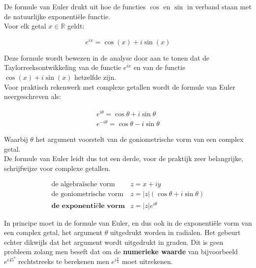 De formule van Euler drukt uit hoe de functies $\cos$ en $\sin$ in verband staan met de natuurlijke exponenti\"{e}le functie.\\
Voor elk getal $x \in \mathbb{R}$ geldt:\\

\begin{framed}
	\[ e^{ix}=\cos(x) + i \sin(x) \]
\end{framed}

Deze formule wordt bewezen in de analyse door aan te tonen dat de Taylorreeksontwikkeling van de functie $e^{ix}$ en van de functie $\cos(x) + i \sin(x)$ hetzelfde zijn. \\

Voor praktisch rekenwerk met complexe getallen wordt de formule van Euler neergeschreven als:\\

\begin{framed}
	\[  \begin{array}{l} 
	e^{i \theta}=\cos \theta +i \sin \theta \\
	e^{-i \theta}=\cos \theta - i \sin \theta 
	\end{array}  \]
\end{framed}

Waarbij $\theta$ het argument voorstelt van de goniometrische vorm van een complex getal. \\
De formule van Euler leidt dus tot een derde, voor de praktijk zeer belangrijke, schrijfwijze voor complexe getallen.\\

\begin{framed}
	\[ \begin{array}{ll}
	\text{de algebra\"{i}sche vorm} & z=x+iy \\
	\text{de goniometrische vorm} & z=|z|(\cos \theta +i \sin \theta) \\
	\textbf{de exponenti\"{e}le vorm} & z=|z|e^{i \theta} \end{array}  \]
\end{framed}

In principe moet in de formule van Euler, en dus ook in de exponenti\"{e}le vorm van een complex getal, het argument $\theta$ uitgedrukt worden in radialen. Het gebeurt echter dikwijls dat het argument wordt uitgedrukt in graden. Dit is geen probleem zolang men beseft dat om de {\bf numerieke waarde} van bijvoorbeeld $e^{i 45^{o}}$ rechtstreeks te berekenen men $e^{i\frac{\pi}{4}}$ moet uitrekenen.\\
	
